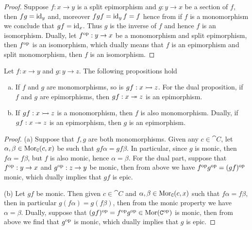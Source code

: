 \begin{proof}
    Suppose \(f: x \to y\) is a split epimorphism and \(g: y \to x\) be a section
    of \(f\), then \(f g = \operatorname{id}_y\) and, moreover \(f g f = \operatorname{id}_y
    f = f\) hence from if \(f\) is a monomorphism we conclude that \(g
    f = \operatorname{id}_x\). Thus \(g\) is the inverse of \(f\) and hence \(f\) is an
    isomorphism. Dually, let \(f^{\mathrm{op}}: y \to x\) be a monomorphism and split
    epimorphism, then \(f^{\mathrm{op}}\) is an isomorphism, which dually means that \(f\)
    is an epimorphism and split monomorphism, then \(f\) is an isomorphism.
\end{proof}

\begin{lemma}
    Let \(f: x \to y\) and \(g: y \to z\). The following propositions hold
    \begin{enumerate}[(a).]\setlength\itemsep{0em}
        \item If \(f\) and \(g\) are monomorphisms, so is \(g f: x \rightarrowtail z\).
              For the dual proposition, if \(f\) and \(g\) are epimorphisms, then \(g
              f: x \twoheadrightarrow z\) is an epimorphism.
        \item If \(g f: x \rightarrowtail z\) is a monomorphism, then \(f\) is also
              monomorphism.  Dually, if \(g f: x \twoheadrightarrow z\) is an epimorphism, then
              \(g\) is an epimorphism.
    \end{enumerate}
\end{lemma}

\begin{proof}
    (a) Suppose that \(f, g\) are both monomorphisms. Given any \(c \in \cat C\),
    let \(\alpha, \beta \in \operatorname{Mor}_{\texttt C}(c, x)\) be such that \(g f \alpha = g f
    \beta\). In particular, since \(g\) is monic, then \(f \alpha = f \beta\), but
    \(f\) is also monic, hence \(\alpha = \beta\). For the dual part, suppose that
    \(f^{\mathrm{op}}: y \to x\) and \(g^{\mathrm{op}}: z \to y\) be monic, then from above we have
    \(f^{\mathrm{op}} g^{\mathrm{op}} = (g f)^{\mathrm{op}}\) monic, which dually implies that \(g f\) is epic.

    (b) Let \(g f\) be monic. Then given \(c \in \cat C\) and \(\alpha, \beta \in
    \operatorname{Mor}_{\texttt C}(c, x)\) such that \(f \alpha = f \beta\), then in particular
    \(g(f \alpha) = g(f \beta)\), then from the monic property we have \(\alpha =
    \beta\). Dually, suppose that \((g f)^{\mathrm{op}} = f^{\mathrm{op}} g^{\mathrm{op}} \in \operatorname{Mor}(\texttt C^{\mathrm{op}})\)
    is monic, then from above we find that \(g^{\mathrm{op}}\) is monic, which dually
    implies that \(g\) is epic.
\end{proof}
